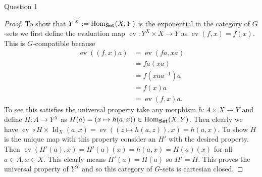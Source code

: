 \documentclass{article}
\DeclareMathOperator{\Id}{Id}
\DeclareMathOperator{\Hom}{Hom}
\newcommand{\catset}{{\bf Set}}
\DeclareMathOperator{\ev}{ev}
\newenvironment{question}[1][]{\begin{paragraph}{Question #1}}{\end{paragraph}}
\theoremstyle{definition}
\begin{document}
\begin{question}[1]
\begin{proof}
        To show that \(Y^{X}:=\Hom_{\catset}(X,Y)\) is the exponential in the
        category of \(G\)-sets we first define the evaluation map
        \(\ev:Y^{X}\times X\to Y\) as \(\ev(f,x)=f(x)\). This is
        \(G\)-compatible because
        \begin{align*}
            \ev((f,x)a) & =\ev(fa,xa)   \\
                        & =fa(xa)       \\
                        & =f(xaa^{-1})a \\
                        & =f(x)a        \\
                        & =\ev(f,x)a.
        \end{align*}
        To see this satisfies the universal property take any morphism
        \(h:A\times X\to Y\) and define \(H:A\to Y{^X}\) as \(H(a)=(x\mapsto
        h(a,x))\in\Hom_{\catset}(X,Y)\). Then clearly we have \(\ev\circ H\times
        \Id_{X}(a,x)=\ev((z\mapsto h(a,z)),x)=h(a,x)\). To show \(H\) is the
        unique map with this property consider an \(H'\) with the desired
        property. Then \(\ev(H'(a),x)=H'(a)(x)=h(a,x)=H(a)(x)\) for all \(a\in
        A,x\in X\). This clearly means \(H'(a)=H(a)\) so \(H'=H\). This proves
        the universal property of \(Y^{X}\) and so this category of \(G\)-sets
        is cartesian closed.
    \end{proof}
\end{question}
\end{document}
